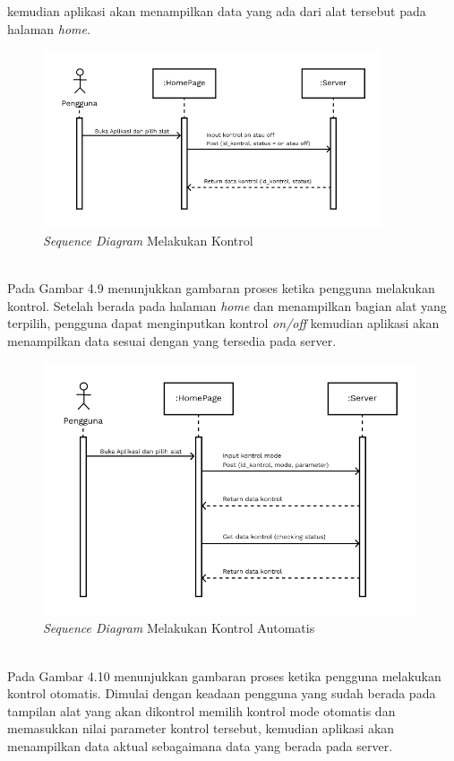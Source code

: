 \begin{flushleft}
\begin{justify}
\begin{enumerate}[label=\alph*.]
            kemudian aplikasi akan menampilkan data yang ada dari alat tersebut pada halaman \emph{home}.
            \vspace{4cm}
            \begin{figure}[ht]
                \centering
                \includegraphics[width=10cm]{images/bab 4/Sequence kontrol.png}
                \caption{\textit{Sequence Diagram} Melakukan Kontrol}
            \end{figure}
            \\Pada Gambar 4.9 menunjukkan gambaran proses ketika pengguna melakukan kontrol. Setelah berada pada halaman \emph{home} dan menampilkan bagian alat yang terpilih, pengguna dapat menginputkan kontrol \emph{on/off} kemudian aplikasi akan menampilkan data sesuai dengan yang tersedia pada server.
            \begin{figure}[ht]
                \centering
                \includegraphics[width=11cm]{images/bab 4/Sequence kontrol Auto.png}
                \caption{\textit{Sequence Diagram} Melakukan Kontrol Automatis}
            \end{figure}
            \\Pada Gambar 4.10 menunjukkan gambaran proses ketika pengguna melakukan kontrol otomatis. Dimulai dengan keadaan pengguna yang sudah berada pada tampilan alat yang akan dikontrol memilih kontrol mode otomatis dan memasukkan nilai parameter kontrol tersebut, kemudian aplikasi akan menampilkan data aktual sebagaimana data yang berada pada server.
            \end{enumerate}


\end{justify}
\end{flushleft}
